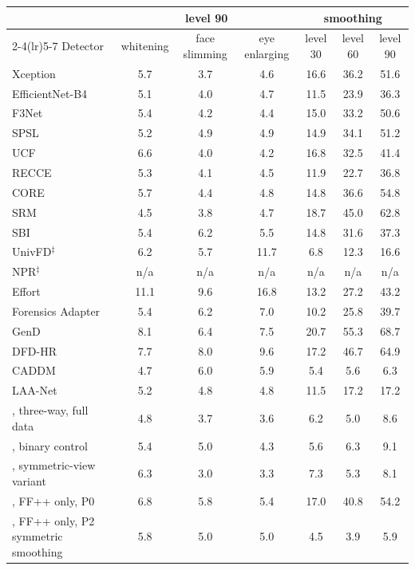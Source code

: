 \begin{tabular}{@{}l ccc ccc@{}}
\toprule
 & \multicolumn{3}{c}{level 90} & \multicolumn{3}{c}{smoothing} \\
\cmidrule(lr){2-4}\cmidrule(lr){5-7}
Detector & whitening & face slimming & eye enlarging & level 30 & level 60 & level 90 \\
\midrule
Xception~\cite{xception} & 5.7 & 3.7 & 4.6 & 16.6 & 36.2 & 51.6 \\
EfficientNet-B4~\cite{efficientnet} & 5.1 & 4.0 & 4.7 & 11.5 & 23.9 & 36.3 \\
F3Net~\cite{f3net} & 5.4 & 4.2 & 4.4 & 15.0 & 33.2 & 50.6 \\
SPSL~\cite{spsl} & 5.2 & 4.9 & 4.9 & 14.9 & 34.1 & 51.2 \\
UCF~\cite{ucf} & 6.6 & 4.0 & 4.2 & 16.8 & 32.5 & 41.4 \\
RECCE~\cite{recce} & 5.3 & 4.1 & 4.5 & 11.9 & 22.7 & 36.8 \\
CORE~\cite{core} & 5.7 & 4.4 & 4.8 & 14.8 & 36.6 & 54.8 \\
SRM~\cite{srm} & 4.5 & 3.8 & 4.7 & 18.7 & 45.0 & 62.8 \\
SBI~\cite{sbi} & 5.4 & 6.2 & 5.5 & 14.8 & 31.6 & 37.3 \\
UnivFD$^\ddagger$~\cite{univfd} & 6.2 & 5.7 & 11.7 & 6.8 & 12.3 & 16.6 \\
NPR$^\ddagger$~\cite{npr} & n/a & n/a & n/a & n/a & n/a & n/a \\
Effort~\cite{effort} & 11.1 & 9.6 & 16.8 & 13.2 & 27.2 & 43.2 \\
Forensics Adapter~\cite{forensicsadapter} & 5.4 & 6.2 & 7.0 & 10.2 & 25.8 & 39.7 \\
GenD~\cite{gend2026} & 8.1 & 6.4 & 7.5 & 20.7 & 55.3 & 68.7 \\
DFD-HR~\cite{dfdhr2026} & 7.7 & 8.0 & 9.6 & 17.2 & 46.7 & 64.9 \\
CADDM~\cite{caddm} & 4.7 & 6.0 & 5.9 & 5.4 & 5.6 & 6.3 \\
LAA-Net~\cite{laanet} & 5.2 & 4.8 & 4.8 & 11.5 & 17.2 & 17.2 \\
\midrule
\ours{}, three-way, full data & 4.8 & 3.7 & 3.6 & 6.2 & 5.0 & 8.6 \\
\ours{}, binary control & 5.4 & 5.0 & 4.3 & 5.6 & 6.3 & 9.1 \\
\ours{}, symmetric-view variant & 6.3 & 3.0 & 3.3 & 7.3 & 5.3 & 8.1 \\
\ours{}, FF++ only, P0 & 6.8 & 5.8 & 5.4 & 17.0 & 40.8 & 54.2 \\
\ours{}, FF++ only, P2 symmetric smoothing & 5.8 & 5.0 & 5.0 & 4.5 & 3.9 & 5.9 \\
\bottomrule
\end{tabular}
